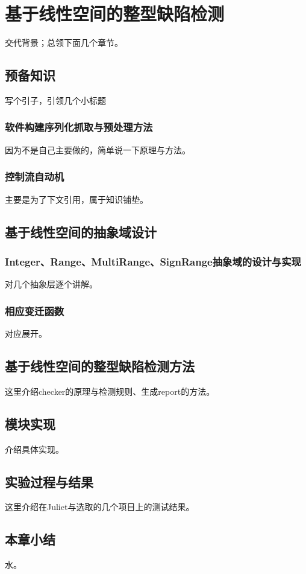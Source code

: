 
\chapter{基于线性空间的整型缺陷检测}

交代背景；总领下面几个章节。

\section{预备知识}

写个引子，引领几个小标题

\subsection{软件构建序列化抓取与预处理方法}

因为不是自己主要做的，简单说一下原理与方法。

\subsection{控制流自动机}

主要是为了下文引用，属于知识铺垫。

\section{基于线性空间的抽象域设计}

\subsection{Integer、Range、MultiRange、SignRange抽象域的设计与实现}

对几个抽象层逐个讲解。

\subsection{相应变迁函数}

对应展开。

\section{基于线性空间的整型缺陷检测方法}

这里介绍checker的原理与检测规则、生成report的方法。

\section{模块实现}

介绍具体实现。

\section{实验过程与结果}

这里介绍在Juliet与选取的几个项目上的测试结果。

\section{本章小结}

水。